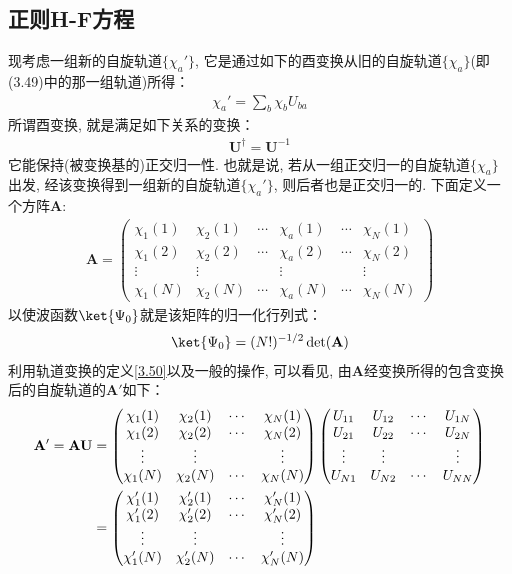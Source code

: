 \subsection{正则H-F方程}
现考虑一组新的自旋轨道$\{\chi_a'\}$, 
它是通过如下的酉变换从旧的自旋轨道$\{\chi_a\}$(即(3.49)中的那一组轨道)所得：
\begin{align}
	\label{3.50}
	\chi_a' = \sum_b\chi_bU_{ba}
\end{align}
所谓酉变换, 
就是满足如下关系的变换：
\begin{align}
	\mathbf{U}^\dagger = \mathbf{U}^{-1}
\end{align}
它能保持(被变换基的)正交归一性. 
也就是说, 
若从一组正交归一的自旋轨道$\{\chi_a\}$出发, 
经该变换得到一组新的自旋轨道$\{\chi_a'\}$, 
则后者也是正交归一的. 
下面定义一个方阵$\mathbf{A}$:
\begin{align}
	\mathbf{A} = 
	\begin{pmatrix}
		\chi_1(1) & \chi_2(1) & \cdots & \chi_a(1) & \cdots & \chi_N(1) \\
		\chi_1(2) & \chi_2(2) & \cdots & \chi_a(2) & \cdots & \chi_N(2) \\
		\vdots    & \vdots    &        & \vdots    &        & \vdots    \\
		\chi_1(N) & \chi_2(N) & \cdots & \chi_a(N) & \cdots & \chi_N(N)
	\end{pmatrix}
\end{align}
以使波函数$\ket{\Psi_0}$就是该矩阵的归一化行列式：
\begin{align}
	\ket{\Psi_0} = (N!)^{-1/2}\det(\mathbf{A})
\end{align}
利用轨道变换的定义\autoref{3.50}以及一般的操作, 
可以看见, 
由$\mathbf{A}$经变换所得的包含变换后的自旋轨道的$\mathbf{A}'$如下：
\begin{align}
	\mathbf{A}'  = \mathbf{AU} & = 
	\begin{pmatrix}
		\chi_1(1) & \chi_2(1) & \cdots & \chi_N(1) \\
		\chi_1(2) & \chi_2(2) & \cdots & \chi_N(2) \\
		\vdots    & \vdots    &        & \vdots    \\
		\chi_1(N) & \chi_2(N) & \cdots & \chi_N(N)
	\end{pmatrix}
	\begin{pmatrix}
		U_{11} & U_{12} & \cdots & U_{1N} \\
		U_{21} & U_{22} & \cdots & U_{2N} \\
		\vdots & \vdots &        & \vdots \\
		U_{N1} & U_{N2} & \cdots & U_{NN}
	\end{pmatrix} \notag\\
	& = \begin{pmatrix}
		\chi_1'(1) & \chi_2'(1) & \cdots & \chi_N'(1) \\
		\chi_1'(2) & \chi_2'(2) & \cdots & \chi_N'(2) \\
		\vdots     & \vdots     &        & \vdots     \\
		\chi_1'(N) & \chi_2'(N) & \cdots & \chi_N'(N)
	\end{pmatrix}
\end{align}
